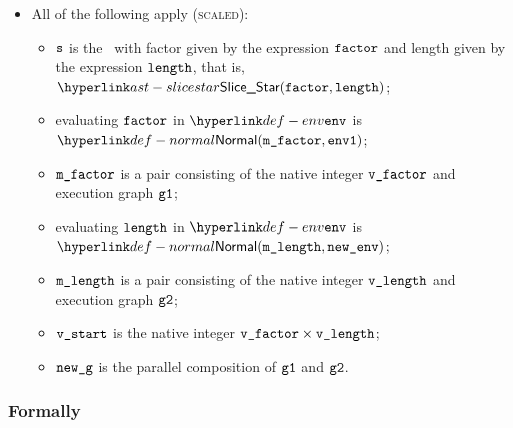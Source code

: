 \begin{itemize}
  \item All of the following apply (\textsc{scaled}):
  \begin{itemize}
    \item $\vs$ is the \scaledslice\ with factor given by the
      expression $\efactor$ and length given by the
      expression $\elength$, that is, $\SliceStar(\efactor, \elength)$;
    \item evaluating $\efactor$ in $\env$ is $\Normal(\mfactor, \envone)$\ProseOrAbnormal;
    \item $\mfactor$ is a pair consisting of the native integer $\vfactor$ and execution graph $\vgone$;
    \item evaluating $\elength$ in $\env$ is $\Normal(\mlength, \newenv)$\ProseOrAbnormal;
    \item $\mlength$ is a pair consisting of the native integer $\vlength$ and execution graph $\vgtwo$;
    \item $\vstart$ is the native integer $\vfactor \times \vlength$;
    \item $\newg$ is the parallel composition of $\vgone$ and $\vgtwo$.
  \end{itemize}
\end{itemize}

\subsubsection{Formally}
\begin{mathpar}
\end{mathpar}

\begin{mathpar}
\end{mathpar}

